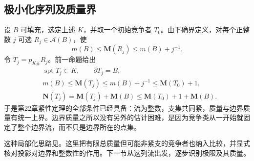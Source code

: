 \subsection{极小化序列及质量界}
\label{g3:subsec:2301:04}
设 \(B\) 可填充，选定上述 \(K\)，并取一个初始竞争者 \(T_0\)。由下确界定义，对每个正整数 \(j\) 可选 \(R_j\in\mathcal A(B)\)，使
\[
	m(B)\le\mathbf M(R_j)\le m(B)+j^{-1}.
\]
令 \(T_j=p_{K\#}R_j\)。前一命题给出
\begin{equation}\label{g3:eq:plateau-minimizing-sequence}
\begin{aligned}
	&\operatorname{spt}T_j\subset K,\qquad \partial T_j=B,\\
	&m(B)\le\mathbf M(T_j)\le m(B)+j^{-1}
	\le\mathbf M(T_0)+1,\\
	&\mathbf N(T_j)=\mathbf M(T_j)+\mathbf M(B)
	\le\mathbf M(T_0)+1+\mathbf M(B).
\end{aligned}
\end{equation}
于是第22章紧性定理的全部条件已经具备：流为整数，支集共同紧，质量与边界质量有统一上界。边界质量之所以没有另外的估计困难，是因为竞争类从一开始就固定了整个边界流，而不只是边界所在的点集。

\ProseParagraphBreak
这种局部化思路见\cite[第34节，引理34.1及证明，第196--197页]{Simon1983}。这里把有限总质量但可能非紧支的竞争者也纳入比较，并显式核对投影对边界和整数性的作用。下一节从这列流出发，逐步识别极限及其质量。
